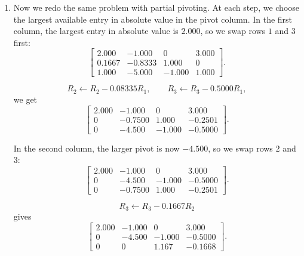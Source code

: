 \documentclass[10pt]{extarticle}
\begin{document}
\begin{enumerate}[label=(\alph*)]
Back substitution from this upper-triangular system gives
\[
z=\frac{7.504\times 10^3}{-5.251\times 10^4}=-0.1429,
\]
\[
0.0002y+1.167z=-0.1667
\qquad \Longrightarrow \qquad
y=0.5000,
\]
and then
\[
x-5y-z=1
\qquad \Longrightarrow \qquad
x=3.357.
\]
So Gaussian elimination with $4$-digit rounding and no pivoting gives
\[
\boxed{
\begin{pmatrix}
x\\
y\\
z
\end{pmatrix}
\approx
\begin{pmatrix}
3.357\\
0.5000\\
-0.1429
\end{pmatrix}}.
\]

\item Now we redo the same problem with partial pivoting. At each step, we choose the largest available entry in absolute value in the pivot column. In the first column, the largest entry in absolute value is $2.000$, so we swap rows $1$ and $3$ first:
\[
\left[
\begin{array}{ccc|c}
2.000 & -1.000 & 0 & 3.000\\
0.1667 & -0.8333 & 1.000 & 0\\
1.000 & -5.000 & -1.000 & 1.000
\end{array}
\right].
\]

\[
R_2\leftarrow R_2-0.08335R_1,\qquad R_3\leftarrow R_3-0.5000R_1,
\]
we get
\[
\left[
\begin{array}{ccc|c}
2.000 & -1.000 & 0 & 3.000\\
0 & -0.7500 & 1.000 & -0.2501\\
0 & -4.500 & -1.000 & -0.5000
\end{array}
\right].
\]

In the second column, the larger pivot is now $-4.500$, so we swap rows $2$ and $3$:
\[
\left[
\begin{array}{ccc|c}
2.000 & -1.000 & 0 & 3.000\\
0 & -4.500 & -1.000 & -0.5000\\
0 & -0.7500 & 1.000 & -0.2501
\end{array}
\right].
\]

\[
R_3\leftarrow R_3-0.1667R_2
\]
gives
\[
\left[
\begin{array}{ccc|c}
2.000 & -1.000 & 0 & 3.000\\
0 & -4.500 & -1.000 & -0.5000\\
0 & 0 & 1.167 & -0.1668
\end{array}
\right].
\]


\end{enumerate}
\end{document}
